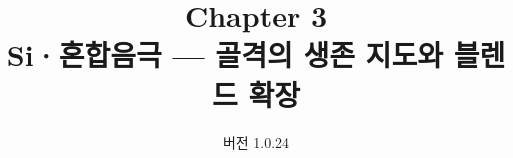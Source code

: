


\renewcommand{\theequation}{3.\arabic{equation}}
\renewcommand{\thesection}{3.\arabic{section}}

\title{\textbf{\LARGE Chapter 3}\\[0.35em]\Large Si·혼합음극 --- 골격의 생존 지도와 블렌드 확장}
\author{}
\date{\normalsize 버전 1.0.24}


\maketitle







\appendix



